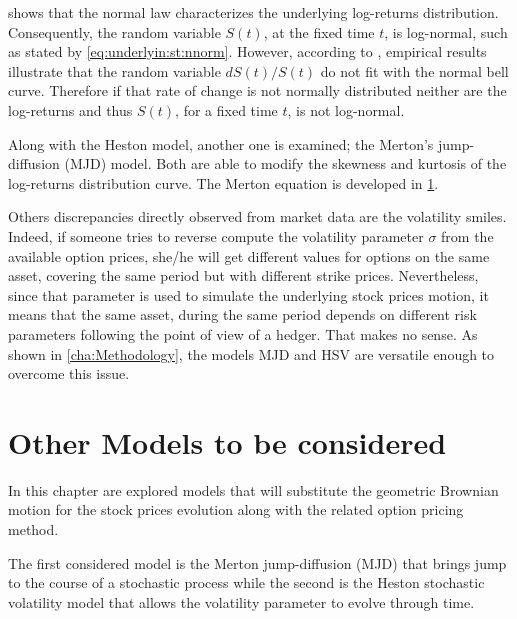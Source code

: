 \documentclass[12pt,a4paper]{report}
\newcommand{\St}{S\left(t\right)}
\begin{document}
 shows that the normal law characterizes the underlying log-returns distribution. Consequently, the random variable $\St$, at the fixed time $t$, is log-normal, such as stated by \cref{eq:underlyin:st:nnorm}. 
However, according to \citet{clark1973}, empirical results illustrate that the random variable $d\St/\St$ do not fit with the normal bell curve.
Therefore if that rate of change is not normally distributed neither are the log-returns and thus $\St$, for a fixed time $t$, is not log-normal.

Along with the Heston model, another one is examined; the Merton's jump-diffusion (MJD) model. Both are able to modify the skewness and kurtosis of the log-returns distribution curve. The Merton equation is developed in \cref{cha:OtherModel}. 

Others discrepancies directly observed from market data are the volatility smiles.
Indeed, if someone tries to reverse compute the volatility parameter $\sigma$ from the available option prices, she/he will get different values for options on the same asset, covering the same period but with different strike prices. 
Nevertheless, since that parameter is used to simulate the underlying stock prices motion, it means that the same asset, during the same period depends on different risk parameters following the point of view of a hedger. That makes no sense.
As shown in \cref{cha:Methodology}, the models MJD and HSV are versatile enough to overcome this issue.












%
%
\chapter{Other Models to be considered}
\label{cha:OtherModel}

In this chapter are explored models that will substitute the geometric Brownian motion for the stock prices evolution along with the related option pricing method.

The first considered model is the Merton jump-diffusion (MJD) that brings jump to the course of a stochastic process while the second is the Heston stochastic volatility model that allows the volatility parameter to evolve through time.
\end{document}
